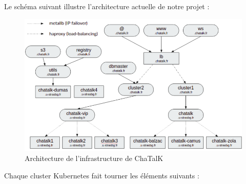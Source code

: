 Le schéma suivant illustre l'architecture actuelle de notre projet :

\begin{figure}
  \caption{\label{infra-arch} Architecture de l'infrastructure de ChaTalK}
  \includegraphics[width=15cm]{images/infra-arch}
\end{figure}

Chaque cluster Kubernetes fait tourner les éléments suivants :

